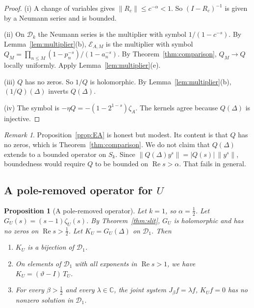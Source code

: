 \documentclass[12pt,letterpaper]{article}
\newtheorem{proposition}[theorem]{Proposition}
\theoremstyle{definition}
\theoremstyle{remark}
\newtheorem{remark}[theorem]{Remark}
\numberwithin{equation}{section}
\newcommand{\Ree}{\operatorname{Re}}
\newcommand{\CC}{\mathbb{C}}
\newcommand{\Dk}{\mathcal{D}_k}
\newcommand{\yD}{\vartheta}
\begin{document}
\begin{proof}
(i) A change of variables gives $\|R_c\|\le c^{-\alpha}<1$. So
$(I-R_c)^{-1}$ is given by a Neumann series and is bounded.

(ii) On $\Dk$ the Neumann series is the multiplier with symbol
$1/(1-c^{-s})$. By Lemma~\ref{lem:multiplier}(b), $\mathcal E_{A,M}$ is the
multiplier with symbol $Q_M=\prod_{n\le M}(1-p_n^{-s})/(1-a_n^{-s})$. By
Theorem~\ref{thm:comparison}, $Q_M\to Q$ locally uniformly. Apply
Lemma~\ref{lem:multiplier}(e).

(iii) $Q$ has no zeros. So $1/Q$ is holomorphic. By
Lemma~\ref{lem:multiplier}(b), $(1/Q)(\Delta)$ inverts $Q(\Delta)$.

(iv) The symbol is $-\eta Q=-(1-2^{1-s})\zeta_A$. The kernels agree
because $Q(\Delta)$ is injective.
\end{proof}

\begin{remark}
Proposition~\ref{prop:EA} is honest but modest. Its content is that $Q$ has
no zeros, which is Theorem~\ref{thm:comparison}. We do not claim that
$Q(\Delta)$ extends to a bounded operator on $S_k$. Since $\|Q(\Delta)y^s\|
=|Q(s)|\,\|y^s\|$, boundedness would require $Q$ to be bounded on
$\Ree s>\alpha$. That fails in general.
\end{remark}

\subsection{A pole-removed operator for \texorpdfstring{$U$}{U}}

\begin{proposition}[A pole-removed operator]\label{prop:KU}
Let $k=1$, so $\alpha=\frac12$. Let $G_U(s)=(s-1)\zeta_U(s)$. By
Theorem~\ref{thm:slit}, $G_U$ is holomorphic and has no zeros on
$\Ree s>\frac12$. Let $K_U=G_U(\Delta)$ on $\mathcal D_1$. Then
\begin{enumerate}[label=(\roman*)]
\item $K_U$ is a bijection of $\mathcal D_1$.
\item On elements of $\mathcal D_1$ with all exponents in $\Ree s>1$, we
  have $K_U=(\yD-I)\,T_U$.
\item For every $\beta>\frac12$ and every $\lambda\in\CC$, the joint
  system $J_\beta f=\lambda f$, $K_Uf=0$ has no nonzero solution in
  $\mathcal D_1$.
\end{enumerate}
\end{proposition}
\end{document}

